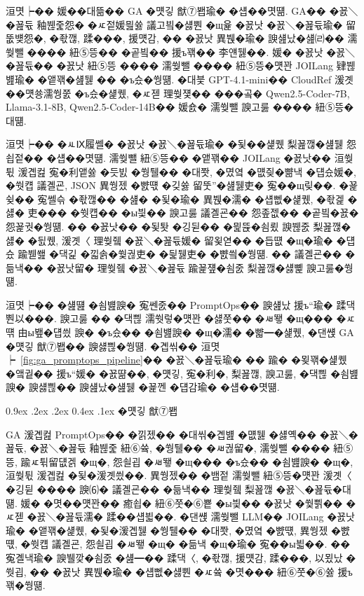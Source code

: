 \documentclass[10pt,twocolumn]{article}
\makeatletter
\renewcommand{\subsection}{\@startsection{subsection}{2}{\z@}%
{0.9ex \@plus .2ex \@minus .2ex}%
{0.4ex \@plus .1ex}%
{\normalfont\normalsize\bfseries}}
\makeatother
\begin{document}
洹몃┝�� 媛��대뜲�� GA �먯깋 猷⑦봽瑜� �섑��몃떎. GA�� �꾨＼�꾪듃 釉붾줉怨� �ㅼ젙媛믪쓣 議고빀�섏뿬 �щ윭 �꾨낫 �꾨＼�꾪듃瑜� 留뚮뱾怨�, �좏깮, 蹂���, 援먯감, �� �꾨낫 異붽�瑜� 諛섎났�섎㈃�� 濡쒖뺄 ���� 紐⑤뜽�� �곹빀�� 援ъ꽦�� 李얜뒗��. 媛� �꾨낫 �꾨＼�꾪듃�� �꾨낫 紐⑤뜽 ���� 濡쒖뺄 ���� 紐⑤뜽�먯꽌 JOILang 肄붾뱶瑜� �앹꽦�섎뒗 �� �ъ슜�쒕떎. �대븣 GPT-4.1-mini�� CloudRef 湲곗��먯쑝濡쒕쭔 �ъ슜�섍퀬, �ㅼ젣 理쒖쟻�� ���곸� Qwen2.5-Coder-7B, Llama-3.1-8B, Qwen2.5-Coder-14B�� 媛숈� 濡쒖뺄 諛고룷 ���� 紐⑤뜽�대떎.

洹몃┝�� �ㅻⅨ履쎌� �꾨낫 �꾨＼�꾪듃瑜� �됯��섍퀬 梨꾪깮�섎뒗 怨쇱젙�� �섑��몃떎. 濡쒖뺄 紐⑤뜽�� �앹꽦�� JOILang �꾨낫�� 洹쒖튃 湲곕컲 寃�利앹쓣 �듯빐 �쒕퉬�� �대쫫, �몄옄 �먮즺�뺢낵 �덉슜媛�, �쒓컙 議곌굔, JSON 異쒕젰 �뺤떇 �깆쓣 留뚯”�섎뒗吏� 寃��щ맂��. �꾩슂�� 寃쎌슦 �좏깮�� �섎� �됯�瑜� 異붽�濡� �섑뻾�섍퀬, �좏겙 �섏� 吏��� �쒓컙�� �ы븿�� 諛고룷 議곌굔�� 怨좊젮�� �곹빀�꾨� 怨꾩궛�쒕떎. �� �꾨낫�� �됯퇏 �깅뒫�� �믩뜑�쇰룄 諛붾줈 梨꾪깮�섏� �딄퀬, 湲곗〈 理쒖쥌 �꾨＼�꾪듃媛� 留욏엳�� �듭떖 �щ�瑜� �덉슜 踰붿쐞 �댁긽 �낇솕�쒗궎吏� �딅뒗吏� �뺤씤�쒕떎. �� 議곌굔�� �듦낵�� �꾨낫留� 理쒖쥌 �꾨＼�꾪듃 踰꾩쟾�쇰줈 梨꾪깮�섏뼱 諛고룷�쒕떎.

洹몃┝�� �섎떒 �쇰뱶諛� 寃쎈줈�� PromptOps�� 諛섎났 援ъ“瑜� 蹂댁뿬以���. 諛고룷 �� �댁쁺 濡쒓렇�먯꽌 �섏쭛�� �ㅽ뙣 �щ��� �ㅼ떆 由ы뵆�덉씠 諛� �ъ슜�� �쇰뱶諛� �щ�濡� �뺣━�섍퀬, �댄썑 GA �먯깋 猷⑦봽�� 諛섏쁺�쒕떎. �곕씪�� 洹몃┝~\ref{fig:ga_promptops_pipeline}�� �꾨＼�꾪듃瑜� �� 踰� �묒꽦�섍퀬 �앸궡�� 援ъ“媛� �꾨땲��, �먯깋, 寃�利�, 梨꾪깮, 諛고룷, �댁쁺 �쇰뱶諛� 諛섏쁺�� 諛섎났�섎뒗 �꾩껜 �덉감瑜� �섑��몃떎.

\subsection{�먯깋 猷⑦봽}

GA 湲곕컲 PromptOps�� �낅젰�� �대씪�곕뱶 �먮뒗 �섏옉�� �꾨＼�꾪듃, �꾨＼�꾪듃 釉붾줉 紐⑥쓬, �쒕퉬�� �ㅽ궎留�, 濡쒖뺄 ���� 紐⑤뜽, 踰ㅼ튂留덊겕 �щ�, 怨쇨굅 �ㅽ뙣 �щ��� �ъ슜�� �쇰뱶諛� �щ�, 洹쒖튃 湲곕컲 �됯�湲곗씠��. 異쒕젰�� �뱀젙 濡쒖뺄 紐⑤뜽�먯꽌 湲곗〈 �깅뒫 ���� 諛⑹� 議곌굔�� �듦낵�� 理쒖쥌 梨꾪깮 �꾨＼�꾪듃�대떎. 媛� �몃��먯꽌�� 癒쇱� 紐⑥쭛�⑥뿉 �ы븿�� �꾨낫 �쒗쁽�� �ㅼ젣 �꾨＼�꾪듃濡� 蹂��섑븳��. �댄썑 濡쒖뺄 LLM�� JOILang �꾨낫瑜� �앹꽦�섍퀬, �됯�湲곕뒗 �쒕퉬�� �대쫫, �몄옄 �뺤떇, 異쒕젰 �뺤떇, �쒓컙 議곌굔, 怨쇨굅 �ㅽ뙣 �щ� �듦낵 �щ�瑜� 寃��ы븳��. �� 寃곌낵瑜� 諛뷀깢�쇰줈 �섎━�� 蹂댁〈, �좏깮, 援먯감, 蹂���, 以묐났 �쒓굅, �� �꾨낫 異붽�瑜� �섑뻾�섏뿬 �ㅼ쓬 �몃��� 紐⑥쭛�⑥쓣 援ъ꽦�쒕떎.
\end{document}
